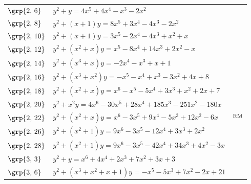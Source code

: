 \begin{longtable}{@{}>{\raggedright\arraybackslash}p{1.35cm}
 >{\raggedright\arraybackslash}p{}
 >{\raggedright\arraybackslash}p{1.1cm}@{}}
$\grp{2,\,6}$ & \href{https://www.lmfdb.org/Genus2Curve/Q/704/a/45056/1}{$y^2 + y = 4x^{5}+4x^{4}-x^{3}-2x^{2}$} & \cite{BSSVY}\\
$\grp{2,\,8}$ & \href{https://www.lmfdb.org/Genus2Curve/Q/464/a/29696/1}{$y^2 + (x+1)y = 8x^{5}+3x^{4}-4x^{3}-2x^{2}$} & \cite{BSSVY}\\
$\grp{2,\,10}$ & \href{https://www.lmfdb.org/Genus2Curve/Q/555/a/8325/1}{$y^2 + (x+1)y = 3x^{5}-2x^{4}-4x^{3}+x^{2}+x$} & \cite{BSSVY}\\
$\grp{2,\,12}$ & \href{https://www.lmfdb.org/Genus2Curve/Q/762/a/82296/1}{$y^2 + (x^{2}+x)y = x^{5}-8x^{4}+14x^{3}+2x^{2}-x$} & \cite{BSSVY}\\
$\grp{2,\,14}$ & \href{https://www.lmfdb.org/Genus2Curve/Q/1416/b/135936/1}{$y^2 + (x^{3}+x)y = -2x^{4}-x^{3}+x+1$} & \cite{BSSVY}\\
$\grp{2,\,16}$ & \href{https://alpha.lmfdb.org/Genus2Curve/Q/?jump=[[8,4,-3,1,-1,-1],[0,0,1,1]]}{$y^2 + (x^{3}+x^{2})y = -x^{5}-x^{4}+x^{3}-3x^{2}+4x+8$} & \cite{BookerSutherland}\\
$\grp{2,\,18}$ & \href{https://alpha.lmfdb.org/Genus2Curve/Q/?jump=[[7,2,1,3,-5,-1,1],[0,1,1]]}{$y^2 + (x^{2}+x)y = x^{6}-x^{5}-5x^{4}+3x^{3}+x^{2}+2x+7$} & \cite{BookerSutherland}\\
$\grp{2,\,20}$ & \href{https://alpha.lmfdb.org/Genus2Curve/Q/?jump=[[0,-180,-251,185,28,-30,4],[0,0,1]]}{$y^2 + x^{2}y = 4x^{6}-30x^{5}+28x^{4}+185x^{3}-251x^{2}-180x$} & \cite{BookerSutherland}\\
$\grp{2,\,22}$ & \href{https://alpha.lmfdb.org/Genus2Curve/Q/?jump=[[0,-6,12,-5,9,-3,1],[0,1,1]]}{$y^2 + (x^{2}+x)y = x^{6}-3x^{5}+9x^{4}-5x^{3}+12x^{2}-6x$} & \cite{BookerSutherland}$^{\rm RM}$\\
$\grp{2,\,26}$ & \href{https://alpha.lmfdb.org/Genus2Curve/Q/?jump=[[0,0,2,3,-12,-3,9],[1,0,1]]}{$y^2 + (x^{2}+1)y = 9x^{6}-3x^{5}-12x^{4}+3x^{3}+2x^{2}$} & \cite{BookerSutherland}\\
$\grp{2,\,28}$ & \href{https://alpha.lmfdb.org/Genus2Curve/Q/?jump=[[0,-3,4,34,-42,-3,9],[1,0,1]]}{$y^2 + (x^{2}+1)y = 9x^{6}-3x^{5}-42x^{4}+34x^{3}+4x^{2}-3x$} & \cite{BookerSutherland}\\
$\grp{3,\,3}$ & \href{https://alpha.lmfdb.org/Genus2Curve/Q/?jump=[[3,3,7,2,4,0,1],[1]]}{$y^2 + y = x^{6}+4x^{4}+2x^{3}+7x^{2}+3x+3$} & \cite{BFT2014}\\
$\grp{3,\,6}$ & \href{https://alpha.lmfdb.org/Genus2Curve/Q/?jump=[[21,-2,7,-5,0,-1],[1,1,1,1]]}{$y^2 + (x^{3}+x^{2}+x+1)y = -x^{5}-5x^{3}+7x^{2}-2x+21$} & \cite{BookerSutherland}\\

\end{longtable}

